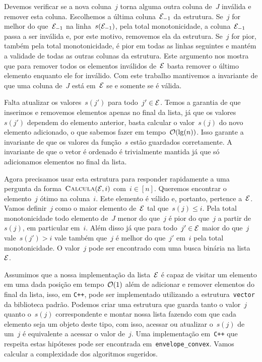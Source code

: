 Devemos verificar se a nova coluna~$j$ torna alguma outra coluna de~$J$ inválida e remover esta coluna. Escolhemos a última coluna~$\mathcal{E}_{-1}$ da estrutura. Se~$j$ for melhor do que~$\mathcal{E}_{-1}$ na linha~$s(\mathcal{E}_{-1})$, pela total monotonicidade, a coluna~$\mathcal{E}_{-1}$ passa a ser inválida e, por este motivo, removemos ela da estrutura. Se~$j$ for pior, também pela total monotonicidade, é pior em todas as linhas seguintes e mantém a validade de todas as outras colunas da estrutura. Este argumento nos mostra que para remover todos os elementos inválidos de~$\mathcal{E}$ basta remover o último elemento enquanto ele for inválido. Com este trabalho mantivemos a invariante de que uma coluna de~$J$ está em~$\mathcal{E}$ se e somente se é válida.

Falta atualizar os valores~$s(j')$ para todo~$j' \in \mathcal{E}$. Temos a garantia de que inserimos e removemos elementos apenas no final da lista, já que os valores~$s(j')$ dependem do elemento anterior, basta calcular o valor~$s(j)$ do novo elemento adicionado, o que sabemos fazer em tempo~$\mathcal{O}(\lg(n))$. Isso garante a invariante de que os valores da função~$s$ estão guardados corretamente. A invariante de que o vetor é ordenado é trivialmente mantida já que só adicionamos elementos no final da lista.

Agora precisamos usar esta estrutura para responder rapidamente a uma pergunta da forma~${ \textsc{Calcula}(\mathcal{E},i) }$ com~$i \in [n]$. Queremos encontrar o elemento~$j$ ótimo na coluna~$i$. Este elemento é válido e, portanto, pertence a~$\mathcal{E}$. Vamos definir~$j$ como o maior elemento de~$\mathcal{E}$ tal que~$s(j) \leq i$. Pela total monotonicidade todo elemento de~$J$ menor do que~$j$ é pior do que~$j$ a partir de~$s(j)$, em particular em~$i$. Além disso já que para todo~$j' \in \mathcal{E}$ maior do que~$j$ vale~$s(j') > i$ vale também que~$j$ é melhor do que~$j'$ em~$i$ pela total monotonicidade. O valor~$j$ pode ser encontrado com uma busca binária na lista~$\mathcal{E}$.

Assumimos que a nossa implementação da lista~$\mathcal{E}$ é capaz de visitar um elemento em uma dada posição em tempo~$\mathcal{O}(1)$ além de adicionar e remover elementos do final da lista, isso, em \texttt{C++}, pode ser implementado utilizando a estrutura~\texttt{vector} da biblioteca padrão. Podemos criar uma estrutura que guarda tanto o valor~$j$ quanto o~$s(j)$ correspondente e montar nossa lista fazendo com que cada elemento seja um objeto deste tipo, com isso, acessar ou atualizar o~$s(j)$ de um~$j$ é equivalente a acessar o valor de~$j$. Uma implementação em~\texttt{C++} que respeita estas hipóteses pode ser encontrada em~\texttt{envelope\_convex}. Vamos calcular a complexidade dos algoritmos sugeridos.

